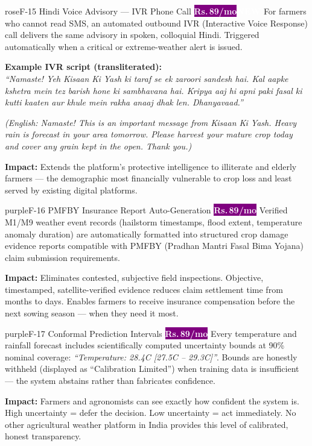 \documentclass[12pt,a4paper]{article}
\newcommand{\Rup}{\textbf{Rs.\,}}
\newcommand{\probadge}{\textcolor{white}{\colorbox{purple}{\footnotesize\textbf{\Rup89/mo}}}}
\newcommand{\newbadge}{\textcolor{white}{\colorbox{rose}{\footnotesize\textbf{NEW}}}}
\begin{document}
\begin{featurebox}{rose}{F-15 \quad Hindi Voice Advisory --- IVR Phone Call \quad \probadge\quad\newbadge}
For farmers who cannot read SMS, an automated outbound IVR (Interactive Voice Response) call delivers the same advisory in spoken, colloquial Hindi. Triggered automatically when a critical or extreme-weather alert is issued.

\vspace{4pt}
\textbf{Example IVR script (transliterated):}\\
\textit{``Namaste! Yeh Kisaan Ki Yash ki taraf se ek zaroori sandesh hai. Kal aapke kshetra mein tez barish hone ki sambhavana hai. Kripya aaj hi apni paki fasal ki kutti kaaten aur khule mein rakha anaaj dhak len. Dhanyavaad.''}

\textit{(English: Namaste! This is an important message from Kisaan Ki Yash. Heavy rain is forecast in your area tomorrow. Please harvest your mature crop today and cover any grain kept in the open. Thank you.)}

\textbf{Impact:} Extends the platform's protective intelligence to illiterate and elderly farmers --- the demographic most financially vulnerable to crop loss and least served by existing digital platforms.
\end{featurebox}

\begin{featurebox}{purple}{F-16 \quad PMFBY Insurance Report Auto-Generation \quad \probadge}
Verified M1/M9 weather event records (hailstorm timestamps, flood extent, temperature anomaly duration) are automatically formatted into structured crop damage evidence reports compatible with PMFBY (Pradhan Mantri Fasal Bima Yojana) claim submission requirements.

\textbf{Impact:} Eliminates contested, subjective field inspections. Objective, timestamped, satellite-verified evidence reduces claim settlement time from months to days. Enables farmers to receive insurance compensation before the next sowing season --- when they need it most.
\end{featurebox}

\begin{featurebox}{purple}{F-17 \quad Conformal Prediction Intervals \quad \probadge}
Every temperature and rainfall forecast includes scientifically computed uncertainty bounds at 90\% nominal coverage: \textit{``Temperature: 28.4\textdegree C [27.5\textdegree C -- 29.3\textdegree C]''}. Bounds are honestly withheld (displayed as ``Calibration Limited'') when training data is insufficient --- the system abstains rather than fabricates confidence.

\textbf{Impact:} Farmers and agronomists can see exactly how confident the system is. High uncertainty = defer the decision. Low uncertainty = act immediately. No other agricultural weather platform in India provides this level of calibrated, honest transparency.
\end{featurebox}
\end{document}
